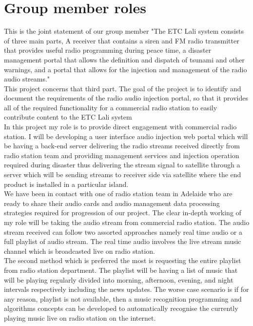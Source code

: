 \section{Group member roles}

This is the joint statement of our group member "The ETC Lali system consists of three main parts, A receiver that contains a siren and FM radio transmitter that provides useful radio programming during peace time, a disaster management portal that allows the definition and dispatch of tsunami and other warnings, and a portal that allows for the injection and management of the radio audio streams."\\

This project concerns that third part. The goal of the project is to identify and document the requirements of the radio audio injection portal, so that it provides all of the required functionality for a commercial radio station to easily contribute content to the ETC Lali system\\
In this project my role is to provide direct engagement with commercial radio station. I will be developing a user interface audio injection web portal which will be having a back-end server delivering the radio streams received directly from radio station team and providing management services and injection operation required during disaster thus delivering the stream signal to satellite through a server which will be sending streams to receiver side via satellite where the end product is installed in a particular island.\\

We have been in contact with one of radio station team in Adelaide who are ready to share their audio cards and audio management data processing strategies required for progression of our project. The clear in-depth working of my role will be taking the audio stream from commercial radio station. The audio stream received can follow two assorted approaches namely real time audio or a full playlist of audio stream. The real time audio involves the live stream music channel which is broadcasted live on radio station.\\

The second method which is preferred the most is requesting the entire playlist from radio station department. The playlist will be having a list of music that will be playing regularly divided into morning, afternoon, evening, and night intervals respectively including the news updates. The worse case scenario is if for any reason, playlist is not available, then a music recognition programming and algorithms concepts can be developed to automatically recognise the currently playing music live on radio station on the internet.\\

